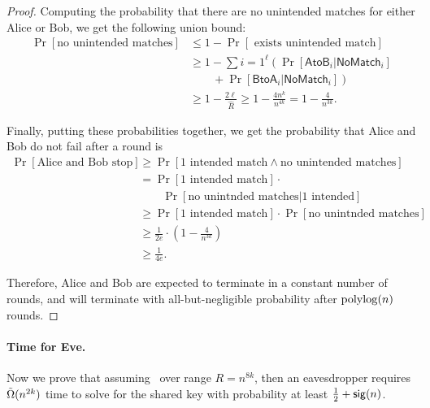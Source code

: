 \begin{proof}
	Computing the probability that there are no unintended matches for either Alice or Bob, we get the following union bound:
	\begin{align*}
	\Pr[\mbox{no unintended matches}] &\le 1 - \Pr[\mbox{ exists unintended match}]\\
	&\ge 1 - \sum{i = 1}^\ell \left( \Pr[\mathsf{AtoB}_i \vert \mathsf{NoMatch}_i]\right.\\
		&\qquad + \left.\Pr[\mathsf{BtoA}_i \vert \mathsf{NoMatch}_i] \right)\\
	&\ge 1 - \frac{2\ell}{\hat R} \ge 1 - \frac{4n^k}{n^{4k}} = 1 - \frac{4}{n^{3k}}.
	\end{align*}
	
	Finally, putting these probabilities together, we get the probability that Alice and Bob do not fail after a round is
	\begin{align*}
	\Pr[\mbox{Alice and Bob stop}] &\ge \Pr[\mbox{1 intended match} \land \mbox{no unintended matches}]\\
	&= \Pr[\mbox{1 intended match}] \cdot\\
		&\qquad \Pr[\mbox{no unintnded matches} | \mbox{1 intended}]\\
	&\ge \Pr[\mbox{1 intended match}] \cdot \Pr[\mbox{no unintnded matches}]\\
	&\ge \frac{1}{2e} \cdot \left(1 - \frac{4}{n^{3k}} \right)\\
	&\ge \frac{1}{4e}.
	\end{align*}
	
	Therefore, Alice and Bob are expected to terminate in a constant number of rounds, and will terminate with all-but-negligible probability after $\polylog(n)$ rounds.
\end{proof}

\paragraph{Time for Eve.}
Now we prove that assuming \strongzkc~over range $R = n^{8k}$, then an eavesdropper requires $\~\Omega(n^{2k})$ time to solve for the shared key with probability at least $\frac{1}{2}+\sig(n)$.

